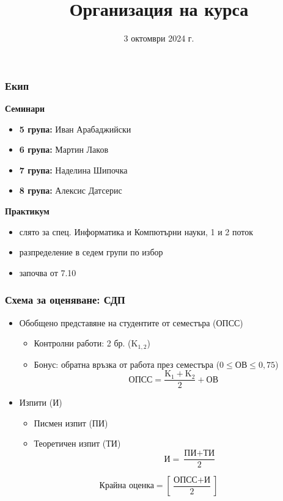 \documentclass[alsotrans,beameroptions={aspectratio=169}]{beamerswitch}
\title{Организация на курса}
\date{3 октомври 2024 г.}
\begin{document}
\begin{frame}
  \titlepage
\end{frame}

\begin{frame}
  \frametitle{Екип}

  \textbf{Семинари}
  \begin{itemize}
  \item \textbf{5 група:} Иван Арабаджийски
  \item \textbf{6 група:} Мартин Лаков
  \item \textbf{7 група:} Наделина Шипочка
  \item \textbf{8 група:} Алексис Датсерис
  \end{itemize}
  \vspace{1ex}
  \textbf{Практикум}
  \begin{itemize}
  \item слято за спец. Информатика и Компютърни науки, 1 и 2 поток
  \item разпределение в седем групи по избор
  \item започва от 7.10
  \end{itemize}
\end{frame}

\begin{frame}
  \frametitle{Схема за оценяване: СДП}

  \begin{itemize}
  \item Обобщено представяне на студентите от семестъра (ОПСС)
    \begin{itemize}
    \item Контролни работи: 2 бр. (K$_{1,2}$)
    \item Бонус: обратна връзка от работа през семестъра ($0 \leq \text{ОВ} \leq 0{,}75$)\\
      \begin{equation*}
        \text{ОПСС} = \frac{\text{K}_1 + \text{K}_2}2 + \text{ОВ}
      \end{equation*}
    \end{itemize}
  \item Изпити (И)
    \begin{itemize}
    \item Писмен изпит (ПИ)
    \item Теоретичен изпит (ТИ)\\[-7.5ex]
      \begin{equation*}
        \qquad\qquad\text{И} = \frac{\text{ПИ} + \text{ТИ}}2
      \end{equation*}
    \end{itemize}
  \end{itemize}
  \vspace{2ex}
  \begin{equation*}
    \text{Крайна оценка} = \left[ \frac{\text{ОПСС} + \text{И}}2 \right]
  \end{equation*}
\end{frame}
\end{document}
